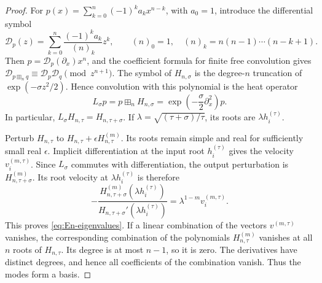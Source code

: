 \documentclass[12pt,reqno]{amsart}
\theoremstyle{definition}
\theoremstyle{remark}
\begin{document}
\begin{proof}
For \(p(x)=\sum_{k=0}^n(-1)^ka_kx^{n-k}\), with \(a_0=1\), introduce
the differential symbol
\begin{equation}\label{eq:differential-symbol}
 \mathcal D_p(z)=\sum_{k=0}^n\frac{(-1)^ka_k}{(n)_k}z^k,
 \qquad (n)_0=1,\quad (n)_k=n(n-1)\cdots(n-k+1).
\end{equation}
Then \(p=\mathcal D_p(\partial_x)x^n\), and the coefficient formula for
finite free convolution gives
\(\mathcal D_{p\boxplus_nq}\equiv\mathcal D_p\mathcal D_q
\pmod{z^{n+1}}\).  The symbol of \(H_{n,\sigma}\) is the degree-\(n\)
truncation of \(\exp(-\sigma z^2/2)\).  Hence convolution with this
polynomial is the heat operator
\begin{equation}\label{eq:heat-operator}
 L_\sigma p=p\boxplus_nH_{n,\sigma}
 =\exp\!\left(-\frac{\sigma}{2}\partial_x^2\right)p.
\end{equation}
In particular, \(L_\sigma H_{n,\tau}=H_{n,\tau+\sigma}\).  If
\(\lambda=\sqrt{(\tau+\sigma)/\tau}\), its roots are
\(\lambda h_i^{(\tau)}\).

Perturb \(H_{n,\tau}\) to
\(H_{n,\tau}+\epsilon H_{n,\tau}^{(m)}\).  Its roots remain simple and
real for sufficiently small real \(\epsilon\).  Implicit differentiation
at the input root \(h_i^{(\tau)}\) gives the velocity
\(v_i^{(m,\tau)}\).  Since \(L_\sigma\) commutes with differentiation,
the output perturbation is \(H_{n,\tau+\sigma}^{(m)}\).  Its root velocity
at \(\lambda h_i^{(\tau)}\) is therefore
\begin{equation}\label{eq:scaled-root-velocity}
 -\frac{H_{n,\tau+\sigma}^{(m)}(\lambda h_i^{(\tau)})}
 {H_{n,\tau+\sigma}'(\lambda h_i^{(\tau)})}
 =\lambda^{1-m}v_i^{(m,\tau)}.
\end{equation}
This proves \eqref{eq:En-eigenvalues}.  If a linear combination of the
vectors \(v^{(m,\tau)}\) vanishes, the corresponding combination of the
polynomials \(H_{n,\tau}^{(m)}\) vanishes at all \(n\) roots of
\(H_{n,\tau}\).  Its degree is at most \(n-1\), so it is zero.
The derivatives have distinct degrees, and hence all coefficients of the
combination vanish.  Thus the modes form a basis.


\end{proof}
\end{document}
